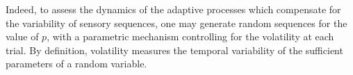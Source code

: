 \documentclass[12pt,english]{article}%
\newcommand{\seeFig}[1]{Figure~\ref{fig:#1}}
\newcommand{\AM}[1]{\textbf{\textcolor{blue}{[AM: #1]}}}
\begin{document}
Indeed, to assess the dynamics of the adaptive processes
which compensate for the variability of sensory sequences,
one may generate random sequences for the value of $p$,
with a parametric mechanism controlling for the volatility at each trial.
By definition, volatility measures the temporal variability
of the sufficient parameters of a random variable.
\end{document}
